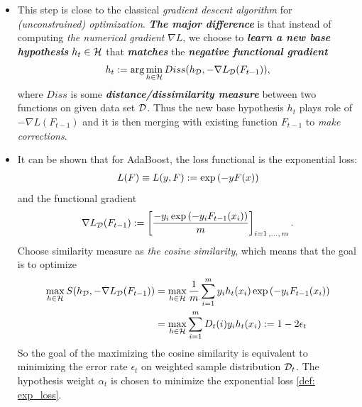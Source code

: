 \documentclass[11pt]{article}
\begin{document}
\begin{itemize}
\item This step is close to the classical \emph{gradient descent algorithm} for \emph{(unconstrained) optimization}. \emph{\textbf{The major difference}} is that instead of computing \emph{the numerical gradient} $\nabla L$, we choose to \emph{\textbf{learn a new base hypothesis}} $h_t \in {\mathcal H}$ that \emph{\textbf{matches}} the \emph{\textbf{negative functional gradient}}
\begin{align}
h_t := \arg\min_{h \in {\mathcal H}}Diss(h_{{\mathcal D}}, -\nabla L_{{\mathcal D}}(F_{t-1}) ),  \label{eqn: functional_gradient_descent}
\end{align} where $Diss$ is some \emph{\textbf{distance/dissimilarity measure}} between two functions on given data set ${\mathcal D}$. Thus the new base hypothesis $h_t$ plays role of $-\nabla L(F_{t-1})$ and it is then merging with existing function $F_{t-1}$ to \emph{make corrections}.

\item It can be shown that for AdaBoost, the loss functional is the exponential loss:
\begin{align}
L(F)  \equiv L(y, F) := \exp\left(- y F(x)\right) \label{def: exp_loss}
\end{align} and the functional gradient 
\begin{align}
\nabla L_{{\mathcal D}}(F_{t-1}) := \left[\frac{-y_i \exp\left(-y_i F_{t-1}(x_i)\right) }{m}\right]_{i=1\,{,}\ldots{,}\,m}. \label{eqn: adaboost_functional_gradient_on_samples}
\end{align} Choose similarity measure as \emph{the  cosine similarity}, which means that the goal is to optimize 
\begin{align*}
\max_{h \in {\mathcal H}} S(h_{{\mathcal D}}, -\nabla L_{{\mathcal D}}(F_{t-1}) ) &= \max_{h \in {\mathcal H}} \frac{1}{m}\sum_{i=1}^{m} y_i h_t(x_i)\exp\left(-y_i F_{t-1}(x_i)\right) \\
&= \max_{h \in {\mathcal H}}\sum_{i=1}^{m}D_{t}(i) y_i h_t(x_i) := 1- 2\epsilon_t
\end{align*} So the goal of the maximizing the cosine similarity is equivalent to minimizing the error rate $\epsilon_t$ on weighted sample distribution ${\mathcal D}_t$. The hypothesis weight $\alpha_t$ is chosen to minimize the exponential loss \eqref{def: exp_loss}.

\end{itemize}
\end{document}
